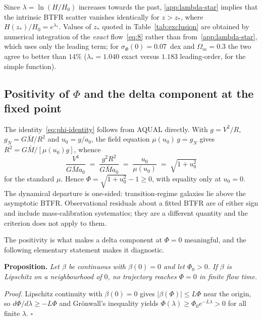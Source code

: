 \documentclass[11pt]{article}
\theoremstyle{plain}
\begin{document}
Since $\lambda=\ln(H/H_{0})$ increases towards the past, \eqref{app:lambda-star}
implies that the intrinsic BTFR scatter vanishes identically for
$z>z_{*}$, where $H(z_{*})/H_{0}=e^{\lambda_{*}}$. Values of $z_{*}$ quoted in
Table~\ref{tab:exclusion} are obtained by numerical integration of the
\emph{exact} flow~\eqref{eq:8} rather than from~\eqref{app:lambda-star}, which
uses only the leading term; for $\sigma_{\Phi}(0)=0.07$~dex and
$\Omega_{m}=0.3$ the two agree to better than $14\%$ ($\lambda_{*}=1.040$
exact versus $1.183$ leading-order, for the simple function).

\subsection{Positivity of \texorpdfstring{$\Phi$}{Phi} and the delta component at the fixed point}
\label{app:delta-component}

The identity~\eqref{eq:phi-identity} follows from AQUAL directly. With
$g=V^{2}/R$, $g_{N}=G\bar M/R^{2}$ and $u_{0}=g/a_{0}$, the field equation
$\mu(u_{0})\,g=g_{N}$ gives $R^{2}=G\bar M/[\mu(u_{0})g]$, whence
\begin{equation}
\frac{V^{4}}{G\bar M a_{0}}
 \;=\; \frac{g^{2}R^{2}}{G\bar M a_{0}}
 \;=\; \frac{u_{0}}{\mu(u_{0})}
 \;=\; \sqrt{1+u_{0}^{2}}
\label{app:phi-identity}
\end{equation}
for the standard $\mu$. Hence $\Phi=\sqrt{1+u_{0}^{2}}-1\ge0$, with equality
only at $u_{0}=0$. The dynamical departure is one-sided: transition-regime
galaxies lie above the asymptotic BTFR. Observational residuals about a fitted
BTFR are of either sign and include mass-calibration systematics; they are a
different quantity and the criterion does not apply to them.

The positivity is what makes a delta component at $\Phi=0$ meaningful, and the following
elementary statement makes it diagnostic.

\medskip
\noindent\textbf{Proposition.} \emph{Let $\beta$ be continuous with
$\beta(0)=0$ and let $\Phi_{0}>0$. If $\beta$ is Lipschitz on a neighbourhood
of $0$, no trajectory reaches $\Phi=0$ in finite flow time.}

\smallskip
\noindent\emph{Proof.} Lipschitz continuity with $\beta(0)=0$ gives
$|\beta(\Phi)|\le L\Phi$ near the origin, so $d\Phi/d\lambda\ge-L\Phi$ and
Gr\"onwall's inequality yields $\Phi(\lambda)\ge\Phi_{0}e^{-L\lambda}>0$ for all
finite $\lambda$. $\square$
\end{document}
